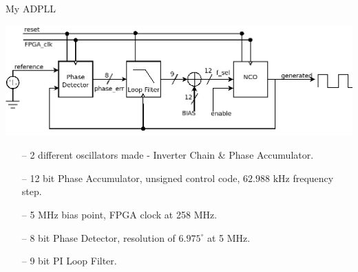 \documentclass{beamer}
\begin{document}
\begin{frame}{My ADPLL}
 	\begin{center}
 		\includegraphics[scale=0.25]{../rtl}
 	\end{center}
		
	\begin{itemize}
		\item[--]
			2 different oscillators made - Inverter Chain \& Phase Accumulator.
		\item[--]
		12 bit Phase Accumulator, unsigned control code, $62.988\textrm{ kHz}$ frequency step.
		\item[--]
			5 MHz bias point, FPGA clock at 258 MHz.		
		\item[--]
			8 bit Phase Detector, resolution of $6.975^\circ$ at 5 MHz.
		\item[--]
			9 bit PI Loop Filter. %
	\end{itemize}
\end{frame}
\end{document}
